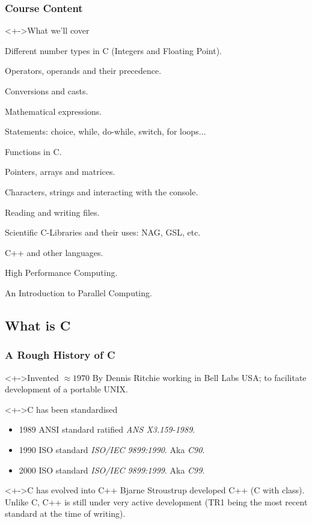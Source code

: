 \documentclass[smaller,table]{beamer} %
\begin{document}
\begin{frame}
\frametitle{Course Content}
\begin{block}<+->{What we'll cover}
\begin{itemize}
\begin{small}
\item Different number types in C (Integers and Floating Point).
\item Operators, operands and their precedence.
\item Conversions and casts.
\item Mathematical expressions.
\item Statements: choice, while, do-while, switch, for loops$\ldots$
\item Functions in C.
\item Pointers, arrays and matrices.
\item Characters, strings and interacting with the console.
\item Reading and writing files.
\item Scientific C-Libraries and their uses: NAG, GSL, etc.
\item C++ and other languages.
\item High Performance Computing.
\item An Introduction to Parallel Computing.
\end{small}
\end{itemize}
\end{block}
\end{frame}

\subsection{What is C}
\begin{frame}
\frametitle{A Rough History of C}
\begin{block}<+->{Invented $\approx{1970}$}
By Dennis Ritchie working in Bell Labs USA; to facilitate development of
a portable UNIX.
\end{block}
\begin{block}<+->{C has been standardised}
\begin{itemize}
\item 1989 ANSI standard ratified \emph{ANS X3.159-1989}.
\item 1990 ISO standard \emph{ISO/IEC 9899:1990}. Aka \emph{C90}.
\item 2000 ISO standard \emph{ISO/IEC 9899:1999}. Aka \emph{C99}.
\end{itemize}
\end{block}
\begin{block}<+->{C has evolved into C++}
Bjarne Stroustrup developed C++ (C with class). Unlike C, C++ is still under
very active development (TR1 being the most recent standard at the time of
writing).
\end{block}
\end{frame}
\end{document}
